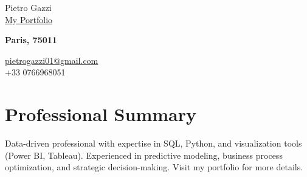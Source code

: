 \documentclass[letterpaper,10.5pt]{article}
\begin{document}
\begin{center}
    {\LARGE Pietro Gazzi}\\
    \href{https://pietrowei.github.io/Portfolio}{\large{\underline{My Portfolio}}}\\
    \begin{multicols}{2}
        \begin{flushleft}
            \textbf{Paris, 75011}
        \end{flushleft}
        \begin{flushright}
            \href{mailto:pietrogazzi01@gmail.com}{pietrogazzi01@gmail.com}\\
            +33 0766968051
        \end{flushright}
    \end{multicols}
\end{center}

\section*{Professional Summary}
Data-driven professional with expertise in SQL, Python, and visualization tools (Power BI, Tableau). Experienced in predictive modeling, business process optimization, and strategic decision-making. Visit my portfolio for more details.

\end{document}
